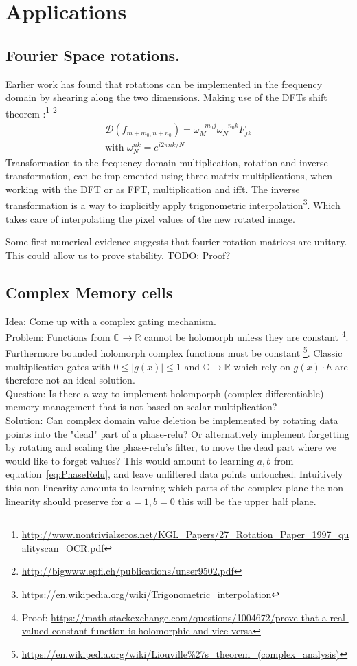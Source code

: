 \documentclass{article}
\begin{document}
\section{Applications}
\subsection{Fourier Space rotations.}
Earlier work has found that rotations can be implemented in the frequency domain by shearing along 
the two dimensions. Making use of the DFTs shift theorem \cite[page 173]{Briggs}:\footnote{\url{http://www.nontrivialzeros.net/KGL_Papers/27_Rotation_Paper_1997_qualityscan_OCR.pdf}}
\footnote{\url{http://bigwww.epfl.ch/publications/unser9502.pdf}}
\begin{align}
\mathcal{D}(f_{m + m_0, n + n_0}) = \omega_M^{-m_0j}\omega_N^{-n_0k}F_{jk} \\
\text{with } \omega_N^{nk} = e^{i2\pi nk/N}
\end{align}
Transformation to the frequency domain multiplication, rotation and inverse transformation, can be implemented using three matrix multiplications, when working with the DFT or as FFT, multiplication and ifft. The inverse transformation is a way to implicitly apply trigonometric interpolation\footnote{\url{https://en.wikipedia.org/wiki/Trigonometric_interpolation}}. Which takes care of interpolating the pixel values of the new rotated image.

Some first numerical evidence suggests that fourier rotation matrices are unitary. This could allow us to prove stability. TODO: Proof?

\subsection{Complex Memory cells}
Idea: Come up with a complex gating mechanism. \\
Problem: Functions from $\mathbb{C} \rightarrow \mathbb{R}$ cannot be holomorph unless they are constant \cite[page 9]{Bornemann}\footnote{Proof: \url{https://math.stackexchange.com/questions/1004672/prove-that-a-real-valued-constant-function-is-holomorphic-and-vice-versa}}. Furthermore bounded holomorph complex functions must be constant \cite[page 38]{Bornemann}\footnote{\url{https://en.wikipedia.org/wiki/Liouville\%27s\_theorem\_(complex\_analysis)}}.
Classic multiplication gates with $0 \leq |g(x)| \leq 1$ and $\mathbb{C} \rightarrow \mathbb{R}$ which rely on $g(x) \cdot h$ are therefore not an ideal solution. \\
Question: Is there a way to implement holomporph (complex differentiable) memory management that is not based on scalar multiplication? \\
Solution: Can complex domain value deletion be implemented by rotating data points into the "dead" part of a phase-relu? Or alternatively implement forgetting by rotating and scaling the phase-relu's filter, to move the dead part where we would like to forget values? This would amount to learning $a,b$ from equation~\ref{eq:PhaseRelu}, and leave unfiltered data points untouched.
Intuitively this non-linearity amounts to learning which parts of the complex plane the non-linearity should preserve for $a=1, b=0$ this will be the upper half plane. 
\end{document}
